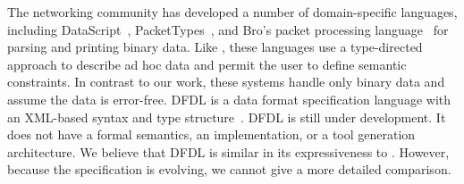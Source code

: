 



The networking community has developed a number of domain-specific
languages, including DataScript~\cite{gpce02}, PacketTypes~\cite{sigcomm00},
and Bro's packet processing
language~\cite{paxson:bro} for parsing and printing binary data.  
Like \padsml{}, these
languages use a type-directed approach to describe ad hoc data and
permit the user to define semantic constraints.  In contrast to our
work, these systems handle only binary data and assume the data is
error-free. DFDL is a data
format specification language with an XML-based syntax and type
structure~\cite{dfdl-proposal,dfdl-primer}. DFDL is still under development.   
It does not have a formal semantics, an implementation, or a tool
generation architecture. We believe that
DFDL is similar in its expressiveness to \padsc{}.  However, because
the specification is evolving, we cannot give a more
detailed comparison.

